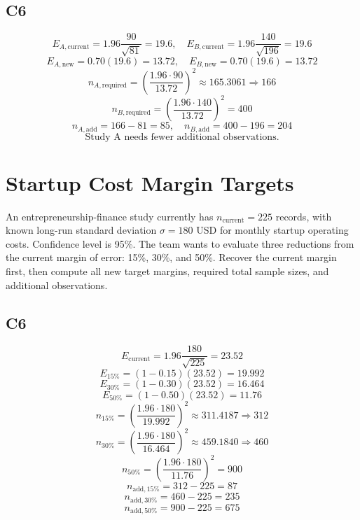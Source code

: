 \begin{ExamProblems}
		\subsection*{C6}
		\[
		E_{A,\text{current}} = 1.96\frac{90}{\sqrt{81}} = 19.6,
		\quad
		E_{B,\text{current}} = 1.96\frac{140}{\sqrt{196}} = 19.6
		\]
		\[
		E_{A,\text{new}} = 0.70(19.6) = 13.72,
		\quad
		E_{B,\text{new}} = 0.70(19.6) = 13.72
		\]
		\[
		n_{A,\text{required}} = \left(\frac{1.96\cdot 90}{13.72}\right)^2
		\approx 165.3061 \Rightarrow 166
		\]
		\[
		n_{B,\text{required}} = \left(\frac{1.96\cdot 140}{13.72}\right)^2 = 400
		\]
		\[
		n_{A,\text{add}} = 166 - 81 = 85,
		\quad
		n_{B,\text{add}} = 400 - 196 = 204
		\]
		\[
		\text{Study A needs fewer additional observations.}
		\]
		
		\item
		\section{Startup Cost Margin Targets}
		An entrepreneurship-finance study currently has $n_{\text{current}} = 225$ records, with known long-run standard deviation $\sigma = 180$ USD for monthly startup operating costs. Confidence level is 95\%. The team wants to evaluate three reductions from the current margin of error: 15\%, 30\%, and 50\%. Recover the current margin first, then compute all new target margins, required total sample sizes, and additional observations.
		
		\subsection*{C6}
		\[
		E_{\text{current}} = 1.96\frac{180}{\sqrt{225}} = 23.52
		\]
		\[
		E_{15\%} = (1-0.15)(23.52) = 19.992
		\]
		\[
		E_{30\%} = (1-0.30)(23.52) = 16.464
		\]
		\[
		E_{50\%} = (1-0.50)(23.52) = 11.76
		\]
		\[
		n_{15\%} = \left(\frac{1.96\cdot 180}{19.992}\right)^2
		\approx 311.4187 \Rightarrow 312
		\]
		\[
		n_{30\%} = \left(\frac{1.96\cdot 180}{16.464}\right)^2
		\approx 459.1840 \Rightarrow 460
		\]
		\[
		n_{50\%} = \left(\frac{1.96\cdot 180}{11.76}\right)^2 = 900
		\]
		\[
		n_{\text{add},15\%} = 312 - 225 = 87
		\]
		\[
		n_{\text{add},30\%} = 460 - 225 = 235
		\]
		\[
		n_{\text{add},50\%} = 900 - 225 = 675
		\]
		
	\end{ExamProblems}
	

